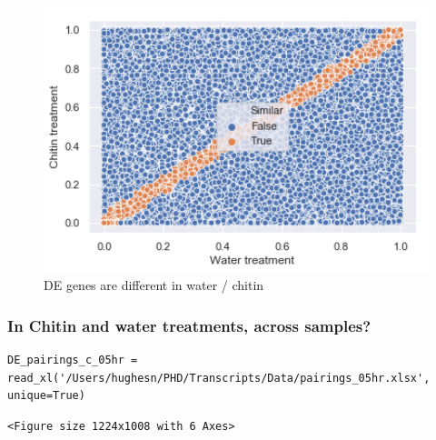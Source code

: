 \documentclass[11pt]{article}
\begin{document}
\begin{figure}[htbp]
\centering
\includegraphics[width=15cm]{obipy-resources/scatter_genes_water_v_chitin.png}
\caption{\label{scatter_genes_water_v_chitin}
DE genes are different in water / chitin}
\end{figure}




\subsubsection{In Chitin and water treatments, across samples?}
\label{sec:org3ed39a1}


\begin{verbatim}
DE_pairings_c_05hr = read_xl('/Users/hughesn/PHD/Transcripts/Data/pairings_05hr.xlsx', unique=True)
\end{verbatim}

\begin{verbatim}
<Figure size 1224x1008 with 6 Axes>
\end{verbatim}
\end{document}
